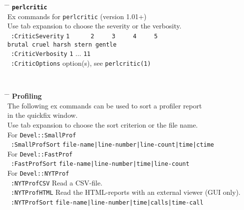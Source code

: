 \documentclass[oneside,10pt,landscape,DIV17]{scrartcl}
\begin{document}
\begin{multicols}{2}
%
\parbox[t][50mm][t]{120mm}{%
%
\begin{tabbing}
\hspace{30mm} \= \hspace{50mm} \= \kill
%
\textbf{\texttt{perlcritic}}\\[1.0ex]
%
Ex commands for \texttt{perlcritic} (version 1.01+)\\
Use tab expansion to choose the severity or the verbosity.\\[2.0ex]
\texttt{ :CriticSeverity}  \> \texttt{1\ \ \ \ \ \ 2\ \ \ \ \ 3\ \ \ \ \ 4\ \ \ \ \ 5} \\
                           \> \texttt{brutal cruel harsh stern gentle} \\[1.0ex]
\texttt{ :CriticVerbosity} \> \texttt{1} $\ldots$ \texttt{11}\\[1.0ex]
\texttt{ :CriticOptions}   \> option(s), see \texttt{perlcritic(1)}\\[5.5ex]
%
\end{tabbing}%
}\\
%
\parbox[t][70mm][t]{120mm}{%
%
\begin{tabbing}
\hspace{30mm} \= \hspace{50mm} \= \kill
%
\large{\textbf{Profiling}}\\[1.0ex]
%
The following ex commands can be used to sort a profiler report \\in the quickfix window.\\
Use tab expansion to choose the sort criterion or the file name.\\[2.0ex]
%
For \texttt{Devel::SmallProf}\\[1.0ex]
\texttt{ :SmallProfSort}   \> \texttt{file-name|line-number|line-count|time|ctime}\\[3.0ex]
%
%
For \texttt{Devel::FastProf}\\[1.0ex]
\texttt{ :FastProfSort}    \> \texttt{file-name|line-number|time|line-count}\\[3.0ex]
%
%
For \texttt{Devel::NYTProf}\\[1.0ex]
\texttt{ :NYTProfCSV}      \> Read a CSV-file.\\[1.0ex]
%
\texttt{ :NYTProfHTML}      \> Read the HTML-reports with an external viewer (GUI only).\\[1.0ex]
%
%
\texttt{ :NYTProfSort}     \> \texttt{file-name|line-number|time|calls|time-call}\\
%
\end{tabbing}
}
\end{multicols}%
%
\end{document}
